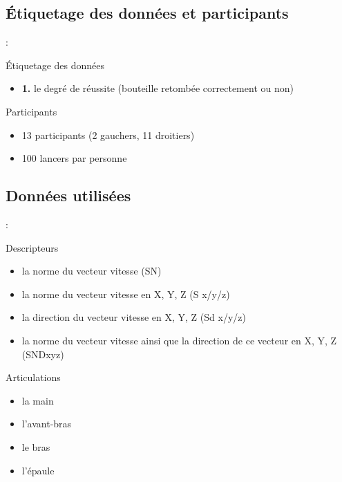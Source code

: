 \documentclass[svgnames]{beamer}
\begin{document}
	\subsection{Étiquetage des données et participants}
	\begin{frame}{\secname : \subsecname}
		\begin{block}{Étiquetage des données}
			\begin{itemize}
				\item \textbf{1.} le degré de réussite (bouteille retombée correctement ou non)
			\end{itemize}
		\end{block}
	
		\begin{block}{Participants}
			\begin{itemize}[label=$\bullet$]
				\item 13 participants (2 gauchers, 11 droitiers)
				\item 100 lancers par personne
			\end{itemize}
		\end{block}
	\end{frame}
	
	\subsection{Données utilisées}	
	\begin{frame}{\secname : \subsecname}
		\begin{block}{Descripteurs}
			\begin{itemize}
				\item la norme du vecteur vitesse (SN)
				\item la norme du vecteur vitesse en X, Y, Z (S x/y/z)
				\item la direction du vecteur vitesse en X, Y, Z (Sd x/y/z)
				\item la norme du vecteur vitesse ainsi que la direction de ce vecteur en X, Y, Z (SNDxyz)
			\end{itemize}
		\end{block}
		
		\begin{block}{Articulations}
			\begin{itemize}
				\item la main
				\item l'avant-bras
				\item le bras
				\item l'épaule
			\end{itemize}
		\end{block}
	\end{frame}
	
\end{document}

